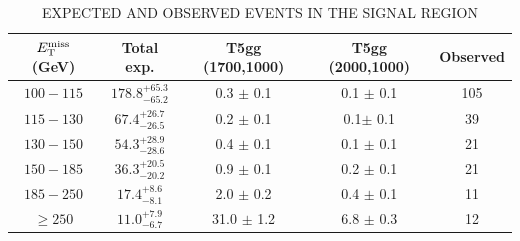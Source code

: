 \begin{table}[ht]
    \caption{EXPECTED AND OBSERVED EVENTS IN THE SIGNAL REGION}
    \centering

    \begin{tabular}{ |c|c|c|c|c|}
        \hline
        
        $E_{\mathrm{T}}^{\text{miss}}$ (GeV) & Total exp. & T5gg (1700,1000) & T5gg (2000,1000)& Observed \\
        \hline
        $100-115$ & ${ 178.8 }^{+ 65.3 }_{- 65.2 }$ & 0.3 $\pm$ 0.1& 0.1 $\pm$ 0.1&105 \\
	$115-130$ & ${ 67.4 }^{+ 26.7 }_{- 26.5 }$  & 0.2 $\pm$ 0.1& 0.1$\pm$ 0.1&39  \\
	$130-150$ & ${ 54.3 }^{+ 28.9 }_{- 28.6 }$  & 0.4 $\pm$ 0.1& 0.1 $\pm$ 0.1&21 \\
	$150-185$ & ${ 36.3 }^{+ 20.5 }_{- 20.2 }$  & 0.9 $\pm$ 0.1& 0.2 $\pm$ 0.1&21 \\
	$185-250$ & ${ 17.4 }^{+ 8.6 }_{- 8.1 }$     & 2.0  $\pm$ 0.2& 0.4 $\pm$ 0.1&11 \\
	$\geq 250$& ${ 11.0 }^{+ 7.9 }_{- 6.7 }$      & 31.0 $\pm$ 1.2&6.8 $\pm$ 0.3& 12 \\

        \hline
    \end{tabular}
    \label{tab:ExpObs}
\end{table}


